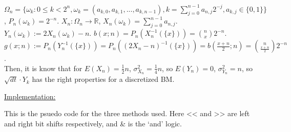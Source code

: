 \documentclass[12pt]{article}
\newcommand{\reals}[0] { \mathbb{R}}
\begin{document}
\begin{flushleft}
$\Omega_n = \{ \omega_k: 0 \le k < 2^n, \omega_k = (a_{k,0}, a_{k,1}, ... ,a_{k,n-1}), k = \sum_{j=0}^{n-1} a_{n,j} 2^{-j}, a_{k,j} \in \{ 0,1 \} \}$, $P_n(\omega_k) = 2^{-n}$. $X_n: \Omega_n \rightarrow \reals$, $X_n(\omega_k) = \sum_{j=0}^{n-1} a_{n,j} $. $Y_n(\omega_k) := 2 X_n(\omega_k) - n$. $b(x; n) = P_n ( X_n^{-1}( \{ x \}) ) = \binom{n}{x} 2^{-n} $. $g(x; n) := P_n ( Y_n^{-1}( \{ x \}) ) = P_n ( (2 X_n - n)^{-1}( \{ x \}) ) =  b(\frac{x+n}{2}; n) = \binom{n}{\frac{x+n}{2}} 2^{-n} $. \\ 
Then, it is know that for $E(X_n) = \frac{1}{2} n $, $\sigma_{X_n}^2 = \frac{1}{4} n$, so $E(Y_n) = 0$, $\sigma_{Y_n}^2 = n$, so $\sqrt{dt} \cdot Y_k$ has the right properties for a discretized BM.
\end{flushleft}

\begin{flushleft}
\underline{Implementation:}
\end{flushleft}

\begin{flushleft}
This is the psuedo code for the three methods used. Here << and >> are left and right bit shifts respectively, and \& is the `and' logic.
\end{flushleft}
\end{document}
